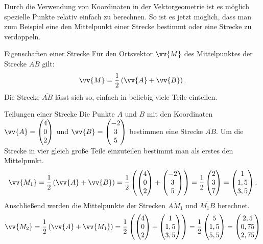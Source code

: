 Durch die Verwendung von Koordinaten in der Vektorgeometrie ist es möglich spezielle Punkte relativ einfach zu berechnen. So ist es jetzt möglich, dass man zum Beispiel eine den Mittelpunkt einer Strecke bestimmt oder eine Strecke zu verdoppeln.
\begin{b8d*}{Eigenschaften einer Strecke}{}
Für den Ortsvektor $\vv{M}$ des Mittelpunktes der Strecke $\overline{AB}$ gilt: $$\vv{M} = \dfrac{1}{2}\left(\vv{A} + \vv{B}\right).$$
Die Strecke $\overline{AB}$ lässt sich so, einfach in beliebig viele Teile einteilen. 
\end{b8d*}
\begin{bsp*}{Teilungen einer Strecke}{}
Die Punkte $A$ und $B$ mit den Koordinaten $\vv{A} = \begin{pmatrix} 4 \\0 \\2 \end{pmatrix}$ und $\vv{B}= \begin{pmatrix} -2 \\3 \\5 \end{pmatrix}$ bestimmen eine Strecke $\overline{AB}$. Um die Strecke in vier gleich große Teile einzuteilen bestimmt man als erstes den Mittelpunkt. $$\vv{M_1}=\dfrac{1}{2}\left(\vv{A} + \vv{B}\right) = \dfrac{1}{2}\left( \begin{pmatrix} 4 \\0 \\2 \end{pmatrix} +  \begin{pmatrix} -2 \\3 \\5 \end{pmatrix} \right)= \dfrac{1}{2}\begin{pmatrix} 2 \\3 \\7 \end{pmatrix} = \begin{pmatrix} 1 \\1,5 \\3,5 \end{pmatrix}. $$ 
Anschließend werden die Mittelpunkte der Strecken $\overline{AM_1}$ und $\overline{M_1B}$ berechnet.
$$\vv{M_2} = \dfrac{1}{2}\left(\vv{A} + \vv{M_1}\right) =  \dfrac{1}{2} \left( \begin{pmatrix} 4 \\0 \\2 \end{pmatrix}  + \begin{pmatrix} 1 \\1,5 \\3,5 \end{pmatrix} \right) = \dfrac{1}{2} \begin{pmatrix} 5 \\1,5 \\5,5 \end{pmatrix} = \begin{pmatrix} 2,5 \\0,75 \\2,75 \end{pmatrix}$$

\end{bsp*}
